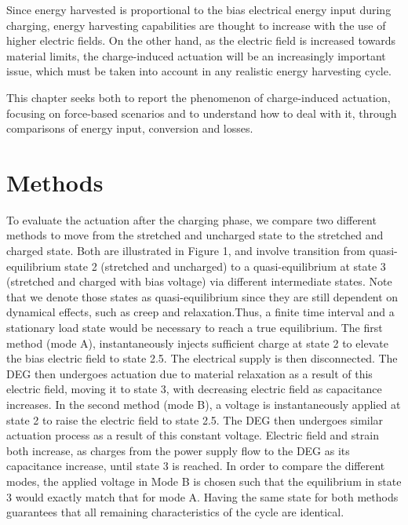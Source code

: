 Since energy harvested is proportional to the bias electrical energy input during charging, energy harvesting capabilities are thought to increase with the use of higher electric fields. On the other hand, as the electric field is increased towards material limits, the charge-induced actuation will be an increasingly important issue, which must be taken into account in any realistic energy harvesting cycle.

This chapter seeks both to report the phenomenon of charge-induced actuation, focusing on force-based scenarios and to understand how to deal with it, through comparisons of energy input, conversion and losses. 

\section{Methods}
\label{sec:methods}
To evaluate the actuation after the charging phase, we compare two different methods to move from the stretched and uncharged state to the stretched and charged state. Both are illustrated in Figure 1, and involve transition from quasi-equilibrium state 2 (stretched and uncharged) to a quasi-equilibrium at state 3 (stretched and charged with bias voltage) via different intermediate states. Note that we denote those states as quasi-equilibrium since they are still dependent on dynamical effects, such as creep and relaxation.Thus, a finite time interval and a stationary load state would be necessary to reach a true equilibrium. 
The first method (mode A), instantaneously injects sufficient charge at state 2 to elevate the bias electric field to state 2.5\textquotesingle.  The electrical supply is then disconnected. The DEG then undergoes actuation due to material relaxation as a result of this electric field, moving it to state 3, with decreasing electric field as capacitance increases.  In the second method (mode B), a voltage is instantaneously applied at state 2 to raise the electric field to state 2.5\textquotedbl. The DEG then undergoes similar actuation process as a result of this constant voltage. Electric field and strain both increase, as charges from the power supply flow to the DEG as its capacitance increase, until state 3 is reached. In order to compare the different modes, the applied voltage in Mode B is chosen such that the equilibrium in state 3 would exactly match that for mode A. Having the same state for both methods guarantees that all remaining characteristics of the cycle are identical. 

